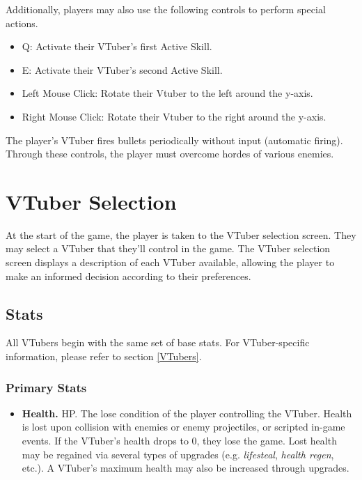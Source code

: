 \documentclass[10pt, a4paper]{article}
\begin{document}
\begin{multicols}{2}
	Additionally, players may also use the following controls to perform special actions.

	\begin{itemize}
		\item Q: Activate their VTuber's first Active Skill.
		\item E: Activate their VTuber's second Active Skill.
		\item Left Mouse Click: Rotate their Vtuber to the left around the y-axis.
		\item Right Mouse Click: Rotate their Vtuber to the right around the y-axis.
	\end{itemize}

	The player's VTuber fires bullets periodically without input (automatic firing). Through these controls, the player must overcome hordes of various enemies.

	\section{VTuber Selection}

	At the start of the game, the player is taken to the VTuber selection screen. They may select a VTuber that they'll control in the game. The VTuber selection screen displays a description of each VTuber available, allowing the player to make an informed decision according to their preferences.
  	
  	\subsection{Stats} \label{Player Stats}
  	
  	All VTubers begin with the same set of base stats. For VTuber-specific information, please refer to section \ref{VTubers}.
  	
  	\subsubsection{Primary Stats}

  	\begin{itemize}
  	\item \textbf{Health.} HP. The lose condition of the player controlling the VTuber. Health is lost upon collision with enemies or enemy projectiles, or scripted in-game events. If the VTuber's health drops to 0, they lose the game. Lost health may be regained via several types of upgrades (e.g. \textit{lifesteal}, \textit{health regen}, etc.). A VTuber's maximum health may also be increased through upgrades.


\end{itemize}
\end{multicols}
\end{document}
